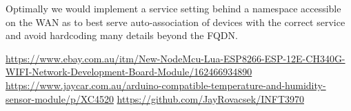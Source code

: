 \documentclass{article}
\begin{document}
    Optimally we would implement a service setting behind a namespace accessible on the WAN as to best serve auto-association of devices with the correct service and avoid hardcoding many details beyond the FQDN.

    \newpage

    \begin{thebibliography}{9}
        \raggedright
            \url{https://www.ebay.com.au/itm/New-NodeMcu-Lua-ESP8266-ESP-12E-CH340G-WIFI-Network-Development-Board-Module/162466934890}
            \url{https://www.jaycar.com.au/arduino-compatible-temperature-and-humidity-sensor-module/p/XC4520}
            \url{https://github.com/JayRovacsek/INFT3970}
    \end{thebibliography}

    
\end{document}
